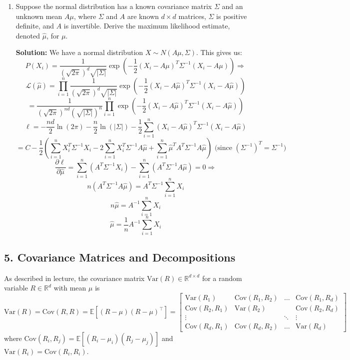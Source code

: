 \documentclass{article}
\newcommand{\solution}{\textbf{Solution: }}
\newcommand{\R}{\mathbb{R}}
\newcommand{\E}{\mathbb{E}}
\newcommand{\Var}{\text{Var}}
\newcommand{\Cov}{\text{Cov}}
\newcommand{\Ell}{\mathcal{L}}
\begin{document}
\begin{enumerate}[label=(\alph*)]
\begin{mdframed}
    \end{mdframed}
    \newpage
    \item Suppose the normal distribution has a known covariance matrix $\Sigma$ and an unknown mean $A \mu$, where $\Sigma$ and $A$ are known $d \times d$ matrices, $\Sigma$ is positive definite, and $A$ is invertible.  Derive the maximum likelihood estimate, denoted $\hat{\mu}$, for $\mu$. \begin{mdframed} \solution
    We have a normal distribution $X \sim N(A\mu, \Sigma)$. This gives us:
    $$P(X_i)=\frac{1}{(\sqrt{2\pi})^d\sqrt{|\Sigma|}}\exp(-\frac{1}{2}(X_i-A\mu)^T\Sigma^{-1}(X_i-A\mu))\Rightarrow$$
    $$\Ell (\hat{\mu})=\prod_{i=1}^n\frac{1}{(\sqrt{2\pi})^d\sqrt{|\Sigma|}}\exp(-\frac{1}{2}(X_i-A\hat{\mu})^T\Sigma^{-1}(X_i-A\hat{\mu}))$$
    $$=\frac{1}{(\sqrt{2\pi})^{nd}(\sqrt{|\Sigma|})^n}\prod_{i=1}^n\exp(-\frac{1}{2}(X_i-A\hat{\mu})^T\Sigma^{-1}(X_i-A\hat{\mu}))$$
    $$\ell=-\frac{nd}{2}\ln(2\pi)-\frac{n}{2}\ln(|\Sigma|)-\frac{1}{2}\sum_{i=1}^n(X_i-A\hat{\mu})^T\Sigma^{-1}(X_i-A\hat{\mu})$$
    $$=C -\frac{1}{2}(\sum_{i=1}^nX_i^T\Sigma^{-1}X_i-2\sum_{i=1}^nX_i^T\Sigma^{-1}A\hat{\mu}+\sum_{i=1}^n\hat{\mu}^TA^T\Sigma^{-1}A\hat{\mu}) \text{ (since }(\Sigma^{-1})^T=\Sigma^{-1})$$
    $$\frac{\partial \ell}{\partial \hat{\mu}}=\sum_{i=1}^n(A^T\Sigma^{-1}X_i)-\sum_{i=1}^n(A^T\Sigma^{-1}A\hat{\mu})=0\Rightarrow$$
    $$n(A^T\Sigma^{-1}A\hat{\mu})=A^T\Sigma^{-1}\sum_{i=1}^nX_i$$
    $$n\hat{\mu}=A^{-1}\sum_{i=1}^nX_i$$
    $$\hat{\mu}=\frac{1}{n}A^{-1}\sum_{i=1}^nX_i$$
    \end{mdframed}
    
\end{enumerate}

\newpage
\subsection*{5. Covariance Matrices and Decompositions}
As described in lecture, the covariance matrix $\text{Var}(R) \in \R^{d\times d}$ for a random variable $R \in \R^d$ with mean $\mu$ is 
$$
\text{Var}(R) = \text{Cov}(R, R) = \E[(R- \mu)(R-\mu)^{\top}] = 
\begin{bmatrix}
\Var(R_1) & \Cov(R_1, R_2) & \ldots & \Cov(R_1, R_d) \\
\Cov(R_2, R_1) & \Var(R_2) & & \Cov(R_2, R_d) \\
\vdots & & \ddots & \vdots \\
\Cov(R_d, R_1) & \Cov(R_d, R_2) & \ldots & \Var(R_d)
\end{bmatrix}
$$
where $\Cov(R_i, R_j) = \E[(R_i - \mu_i)(R_j - \mu_j)]$ and $\Var(R_i) = \Cov(R_i, R_i)$. \\
\end{document}
